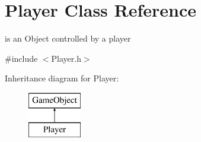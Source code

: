 \hypertarget{classPlayer}{}\section{Player Class Reference}
\label{classPlayer}


is an Object controlled by a player  




{\ttfamily \#include $<$Player.\+h$>$}

Inheritance diagram for Player\+:\begin{figure}[H]
\begin{center}
\leavevmode
\includegraphics[height=2.000000cm]{classPlayer}
\end{center}
\end{figure}
